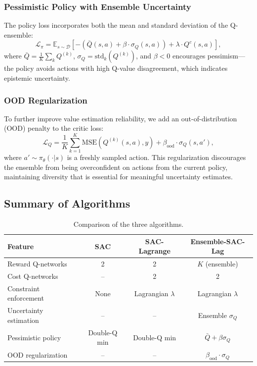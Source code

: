 \documentclass[10pt]{article}
\begin{document}
\subsubsection{Pessimistic Policy with Ensemble Uncertainty}

The policy loss incorporates both the mean and standard deviation of the Q-ensemble:
\begin{equation}
    \mathcal{L}_\pi = \mathbb{E}_{s \sim \mathcal{D}} \left[ -\left( \bar{Q}(s,a) + \beta \cdot \sigma_Q(s,a) \right) + \lambda \cdot Q^c(s,a) \right],
    \label{eq:ensemble_policy}
\end{equation}
where $\bar{Q} = \frac{1}{K}\sum_k Q^{(k)}$, $\sigma_Q = \text{std}_k(Q^{(k)})$, and $\beta < 0$ encourages pessimism---the policy avoids actions with high Q-value disagreement, which indicates epistemic uncertainty.

\subsubsection{OOD Regularization}

To further improve value estimation reliability, we add an out-of-distribution (OOD) penalty to the critic loss:
\begin{equation}
    \mathcal{L}_Q = \frac{1}{K} \sum_{k=1}^K \text{MSE}(Q^{(k)}(s,a), y) + \beta_{\text{ood}} \cdot \sigma_Q(s, a'),
    \label{eq:ood_loss}
\end{equation}
where $a' \sim \pi_\theta(\cdot|s)$ is a freshly sampled action. This regularization discourages the ensemble from being overconfident on actions from the current policy, maintaining diversity that is essential for meaningful uncertainty estimates.

\subsection{Summary of Algorithms}

\begin{table}[h]
\centering
\caption{Comparison of the three algorithms.}
\label{tab:algo_comparison}
\begin{tabular}{lccc}
\toprule
Feature & SAC & SAC-Lagrange & Ensemble-SAC-Lag \\
\midrule
Reward Q-networks & 2 & 2 & $K$ (ensemble) \\
Cost Q-networks & -- & 2 & 2 \\
Constraint enforcement & None & Lagrangian $\lambda$ & Lagrangian $\lambda$ \\
Uncertainty estimation & -- & -- & Ensemble $\sigma_Q$ \\
Pessimistic policy & Double-Q min & Double-Q min & $\bar{Q} + \beta\sigma_Q$ \\
OOD regularization & -- & -- & $\beta_{\text{ood}} \cdot \sigma_Q$ \\
\bottomrule
\end{tabular}
\end{table}
\end{document}
